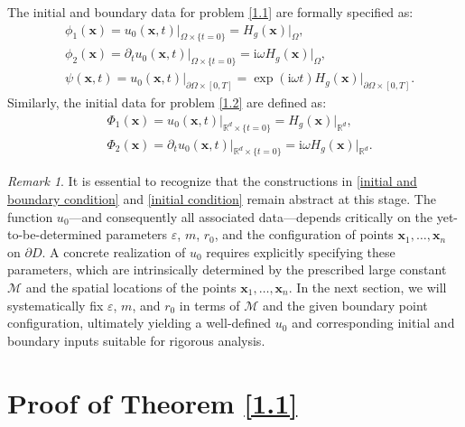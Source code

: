 \documentclass[11pt,reqno,oneside]{amsart}
\numberwithin{equation}{section}
\theoremstyle{definition}
\theoremstyle{remark}
\newtheorem{remark}[theorem]{Remark}
\numberwithin{equation}{section}
\begin{document}
	The initial and boundary data for problem \eqref{1.1} are formally specified as:
	\begin{equation}\label{initial and boundary condition}
		\begin{aligned}
			& \phi_1(\mathbf{x}) = \left. u_0(\mathbf{x},t) \right|_{\Omega \times \{ t=0 \}} = H_{g}(\mathbf{x})|_{\Omega}, \\
			& \phi_2(\mathbf{x}) = \partial_t u_0 \left. (\mathbf{x},t) \right|_{\Omega \times \{ t=0 \}} = \mathrm{i}\omega H_{g}(\mathbf{x})|_{\Omega}, \\
			& \psi(\mathbf{x},t) = u_0 \left. (\mathbf{x},t) \right|_{\partial \Omega \times [0,T]} = \exp(\mathrm{i}\omega t)H_g(\mathbf{x})|_{\partial \Omega \times [0,T]}.
		\end{aligned}
	\end{equation}
	Similarly, the initial data for problem \eqref{1.2} are defined as:
	\begin{equation}\label{initial condition}
		\begin{aligned}
			& \Phi_1(\mathbf{x}) = \left. u_0(\mathbf{x},t) \right|_{\mathbb{R}^d \times \{ t=0 \}} = H_{g}(\mathbf{x})|_{\mathbb{R}^d}, \\
			& \Phi_2(\mathbf{x}) = \partial_t u_0 \left. (\mathbf{x},t) \right|_{\mathbb{R}^d \times \{ t=0 \}} = \mathrm{i}\omega H_{g}(\mathbf{x})|_{\mathbb{R}^d}.
		\end{aligned}
	\end{equation}
	
\begin{remark}
	It is essential to recognize that the constructions in \eqref{initial and boundary condition} and \eqref{initial condition} remain abstract at this stage. The function $u_0$—and consequently all associated data—depends critically on the yet-to-be-determined parameters $\varepsilon$, $m$, $r_0$, and the configuration of points $\mathbf{x}_1, \dots, \mathbf{x}_n$ on $\partial D$. A concrete realization of $u_0$ requires explicitly specifying these parameters, which are intrinsically determined by the prescribed large constant $\mathcal{M}$ and the spatial locations of the points $\mathbf{x}_1, \dots, \mathbf{x}_n$. In the next section, we will systematically fix $\varepsilon$, $m$, and $r_0$ in terms of $\mathcal{M}$ and the given boundary point configuration, ultimately yielding a well-defined $u_0$ and corresponding initial and boundary inputs suitable for rigorous analysis.
\end{remark}
	
	\section{Proof of Theorem \ref{1.1}}\label{sec:4}
	
\end{document}
